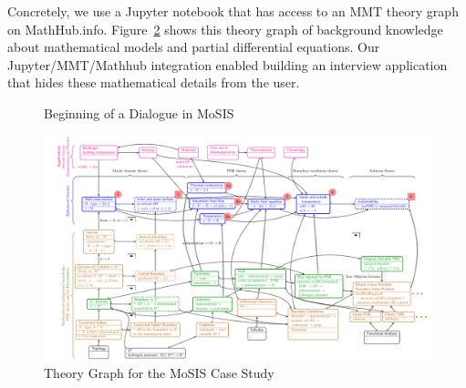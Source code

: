 Concretely, we use a Jupyter notebook that has access to an MMT theory graph on MathHub.info.
Figure~\ref{fig:pde-theory} shows this theory graph of background knowledge about mathematical models and partial differential equations.
Our Jupyter/MMT/Mathhub integration enabled building an interview application that hides these mathematical details from the user.  

\begin{figure}[ht]
  \caption{Beginning of a Dialogue in MoSIS}\label{fig:int_begin}
\end{figure}

\begin{figure}[h!p]\centering
  \begin{turn}{-90}\includegraphics[width=0.95\textheight]{pde-theory}\end{turn}
  \caption{Theory Graph for the MoSIS Case Study}\label{fig:pde-theory}
\end{figure}

